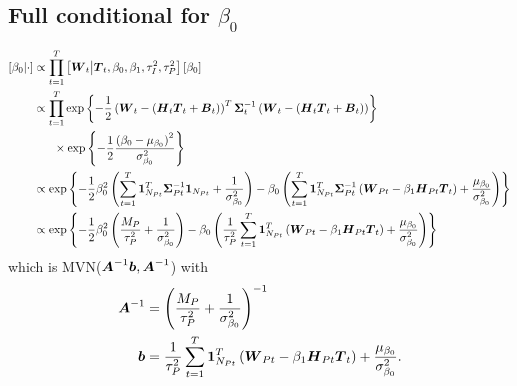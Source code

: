 \documentclass{article}\usepackage[]{graphicx}\usepackage[]{color}
\def\bm#1{\mbox{\boldmath $#1$}}
\begin{document}
\subsection{Full conditional for $\beta_0$}
%
\begin{align*}
%
\left[ \beta_0 \middle| \cdot \right] & \propto \prod_{t = 1}^T \left[ \bm{W}_t \middle| \bm{T}_t, \beta_0, \beta_1, \tau^2_I, \tau^2_P \right] \left[ \beta_0 \right]\\
%
& \propto \prod_{t = 1}^T \exp{ \left\{ - \frac{1} {2} \left( \bm{W}_t - \left( \bm{H}_t \bm{T}_t + \bm{B}_t \right) \right)^T \bm{\Sigma}_t^{ - 1} \left( \bm{W}_t - \left( \bm{H}_t \bm{T}_t + \bm{B}_t \right) \right) \right\} }\\
& \hspace{6mm} \times \exp{ \left\{ - \frac{1} {2} \frac{ \left( \beta_0 - \mu_{\beta_0} \right)^2 } {\sigma^2_{\beta_0}} \right\} }\\
%
& \propto \exp{ \left\{ - \frac{1} {2} \beta_0^2 \left( \sum_{t = 1}^T \bm{1}_{N_{Pt}}^T \bm{\Sigma}_{Pt}^{ - 1} \bm{1}_{N_{Pt}} + \frac{1} {\sigma^2_{\beta_0}}  \right) - \beta_0 \left( \sum_{t = 1}^T \bm{1}_{N_{Pt}}^T \bm{\Sigma}_{Pt}^{ - 1} \left( \bm{W}_{Pt} - \beta_1 \bm{H}_{Pt} \bm{T}_t \right) + \frac{\mu_{\beta_0}} {\sigma^2_{\beta_0}} \right) \right\} }\\
%
& \propto \exp{ \left\{ - \frac{1} {2} \beta_0^2 \left( \frac{M_P} {\tau^2_P} + \frac{1} {\sigma^2_{\beta_0}} \right) - \beta_0 \left( \frac{1} {\tau^2_P} \sum_{t = 1}^T \bm{1}_{N_{Pt}}^T \left( \bm{W}_{Pt} - \beta_1 \bm{H}_{Pt} \bm{T}_t \right) + \frac{\mu_{\beta_0}} {\sigma^2_{\beta_0}} \right) \right\} }\\
%
\end{align*}
%
which is MVN($\bm{A}^{ - 1}\bm{b}, \bm{A}^{ - 1}$) with \\
\begin{align*}
%
\bm{A}^{ - 1} & = \left( \frac{M_P} {\tau^2_P} + \frac{1} {\sigma^2_{\beta_0}} \right)^{ - 1}\\
%
\bm{b} & = \frac{1} {\tau^2_P} \sum_{t = 1}^T \bm{1}_{N_{Pt}}^T \left( \bm{W}_{Pt} - \beta_1 \bm{H}_{Pt} \bm{T}_t \right)  + \frac{\mu_{\beta_0}} {\sigma^2_{\beta_0}}.\\
%
\end{align*}
%
%
\end{document}

